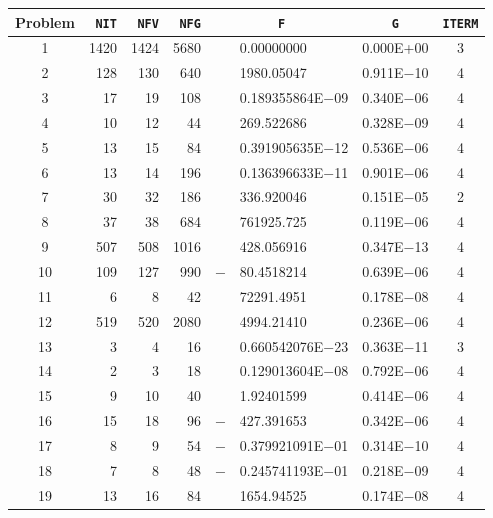 \documentclass{esub2acm}
\begin{document}
\begin{table}
\footnotesize
\centering
\begin{tabular}{c|rrrr@{}lcc} \hline
Problem\rule[-2pt]{0pt}{12pt} & {\tt NIT} & {\tt NFV} & {\tt NFG} & \multicolumn{2}{c}{\tt F} & {\tt G} & {\tt ITERM} \\ \hline
1\rule[-2pt]{0pt}{12pt} &   1420    &   1424    &   5680    &       &   0.00000000  &   0.000E+00   &   3   \\
2   &   128 &   130 &   640 &       &   1980.05047  &   0.911E$-$10 &   4   \\
3   &   17  &   19  &   108 &       &   0.189355864E$-$09   &   0.340E$-$06 &   4   \\
4   &   10  &   12  &   44  &       &   269.522686  &   0.328E$-$09 &   4   \\
5   &   13  &   15  &   84  &       &   0.391905635E$-$12   &   0.536E$-$06 &   4   \\
6   &   13  &   14  &   196 &       &   0.136396633E$-$11   &   0.901E$-$06 &   4   \\
7   &   30  &   32  &   186 &       &   336.920046  &   0.151E$-$05 &   2   \\
8   &   37  &   38  &   684 &       &   761925.725  &   0.119E$-$06 &   4   \\
9   &   507 &   508 &   1016    &       &   428.056916  &   0.347E$-$13 &   4   \\
10  &   109 &   127 &   990 &   $-$ &   80.4518214  &   0.639E$-$06 &   4   \\
11  &   6   &   8   &   42  &       &   72291.4951  &   0.178E$-$08 &   4   \\
12  &   519 &   520 &   2080    &       &   4994.21410  &   0.236E$-$06 &   4   \\
13  &   3   &   4   &   16  &       &   0.660542076E$-$23   &   0.363E$-$11 &   3   \\
14  &   2   &   3   &   18  &       &   0.129013604E$-$08   &   0.792E$-$06 &   4   \\
15  &   9   &   10  &   40  &       &   1.92401599  &   0.414E$-$06 &   4   \\
16  &   15  &   18  &   96  &   $-$ &   427.391653  &   0.342E$-$06 &   4   \\
17  &   8   &   9   &   54  &   $-$ &   0.379921091E$-$01   &   0.314E$-$10 &   4   \\
18  &   7   &   8   &   48  &   $-$ &   0.245741193E$-$01   &   0.218E$-$09 &   4   \\
19  &   13  &   16  &   84  &       &   1654.94525  &   0.174E$-$08 &   4   \\

\end{tabular}
\end{table}
\end{document}
